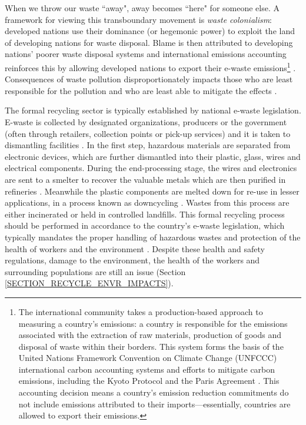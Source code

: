 \documentclass{article}
\newcounter{subsubsubsection}[subsubsection]
\begin{document}
When we throw our waste ``away", away becomes ``here" for someone else. A framework for viewing this transboundary movement is \textit{waste colonialism}: developed nations use their dominance (or hegemonic power) to exploit the land of developing nations for waste disposal. Blame is then attributed to developing nations' poorer waste disposal systems and international emissions accounting reinforces this by allowing developed nations to export their e-waste emissions\footnote{The international community takes a production-based approach to measuring a country's emissions: a country is responsible for the emissions associated with the extraction of raw materials, production of goods and disposal of waste within their borders. This system forms the basis of the United Nations Framework Convention on Climate Change (UNFCCC) international carbon accounting systems and efforts to mitigate carbon emissions, including the Kyoto Protocol and the Paris Agreement \cite{unfccc2009kyoto, unfccc2015paris}. This accounting decision means a country's emission reduction commitments do not include emissions attributed to their imports---essentially, countries are allowed to export their emissions.} \cite{tukker2020consumption, wang2007owns}. Consequences of waste pollution disproportionately impacts those who are least responsible for the pollution and who are least able to mitigate the effects \cite{liboiron2018plastic, pratt2010decreasing}.

The formal recycling sector is typically established by national e-waste legislation. E-waste is collected by designated organizations, producers or the government (often through retailers, collection points or pick-up services) and it is taken to dismantling facilities \cite{forti2020global}. In the first step, hazardous materials are separated from electronic devices, which are further dismantled into their plastic, glass, wires and electrical components. During the end-processing stage, the wires and electronics are sent to a smelter to recover the valuable metals which are then purified in refineries \cite{kumar2017waste}. Meanwhile the plastic components are melted down for re-use in lesser applications, in a process known as downcycling \cite{braungart2007cradle}. Wastes from this process are either incinerated or held in controlled landfills. This formal recycling process should be performed in accordance to the country's e-waste legislation, which typically mandates the proper handling of hazardous wastes and protection of the health of workers and the environment \cite{forti2020global}. Despite these health and safety regulations, damage to the environment, the health of the workers and surrounding populations are still an issue (Section \ref{SECTION_RECYCLE_ENVR_IMPACTS}).
\end{document}
